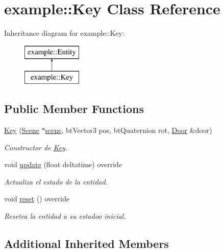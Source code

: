 \hypertarget{classexample_1_1_key}{}\section{example\+::Key Class Reference}
\label{classexample_1_1_key}
Inheritance diagram for example\+::Key\+:\begin{figure}[H]
\begin{center}
\leavevmode
\includegraphics[height=2.000000cm]{classexample_1_1_key}
\end{center}
\end{figure}
\subsection*{Public Member Functions}
\begin{DoxyCompactItemize}
\item 
\mbox{\hyperlink{classexample_1_1_key_a33c929fc7668b5d68bf6671e1c0b0cfe}{Key}} (\mbox{\hyperlink{classexample_1_1_scene}{Scene}} $\ast$\mbox{\hyperlink{classexample_1_1_entity_ab851dbde4a16829f9fb77ab9a66b9f1e}{scene}}, bt\+Vector3 pos, bt\+Quaternion rot, \mbox{\hyperlink{classexample_1_1_door}{Door}} \&door)
\begin{DoxyCompactList}\small\item\em Constructor de \mbox{\hyperlink{classexample_1_1_key}{Key}}. \end{DoxyCompactList}\item 
void \mbox{\hyperlink{classexample_1_1_key_ac462e54ccbfec9767a2def808ff6c198}{update}} (float deltatime) override
\begin{DoxyCompactList}\small\item\em Actualiza el estado de la entidad. \end{DoxyCompactList}\item 
void \mbox{\hyperlink{classexample_1_1_key_aff9c8392d5275a833d005673b0273785}{reset}} () override
\begin{DoxyCompactList}\small\item\em Resetea la entidad a su estadoo inicial. \end{DoxyCompactList}\end{DoxyCompactItemize}
\subsection*{Additional Inherited Members}


